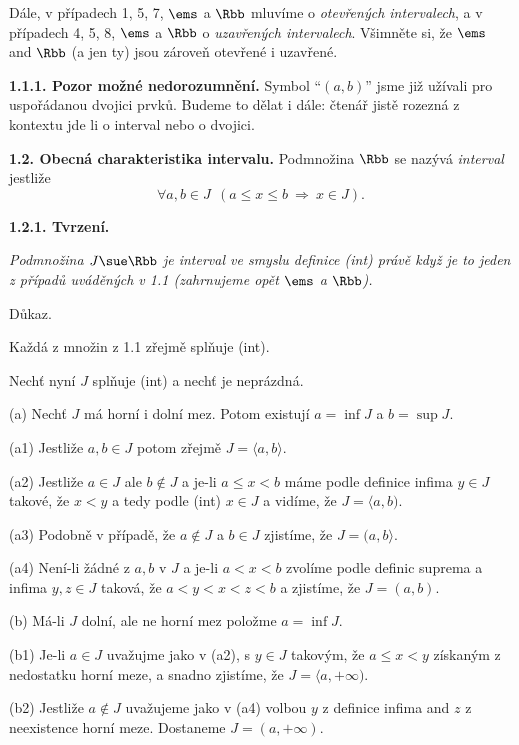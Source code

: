 \documentclass[12pt]{article}
\begin{document}
{Dále, v případech 1, 5, 7, $\ems$ a $\Rbb$ mluvíme o  {\em otevřených intervalech}, a
 v případech 4, 5, 8, $\ems$ a $\Rbb$ o {\em uzavřených intervalech}. Všimněte si, že $\ems$ and
 $\Rbb$ (a jen ty) jsou zároveň otevřené i uzavřené.
 
 \medskip
 
 {\bf 1.1.1. Pozor možn\'e nedorozumnění.} Symbol ``$(a,b)$'' jsme již užívali pro uspořádanou dvojici prvků. Budeme to dělat i dále: čtenář jistě rozezná z kontextu jde li o interval nebo o dvojici.
 
 \bigskip
 
 {\bf 1.2. Obecná charakteristika intervalu.} Podmnožina $\Rbb$ se nazývá 
{\em interval} jestliže
 \begin{equation}
 \forall a,b\in J\ \ (a\leq x\leq b\ \Rightarrow\ x\in J). \tag{int}
 \end{equation}
 
 \medskip
 
 {\bf 1.2.1. Tvrzení.} {\em Podmnožina $J\sue\Rbb$ je interval ve smyslu definice {\em (int)} právě když je to  jeden z případů uváděných v 1.1 (zahrnujeme opět $\ems$ a $\Rbb$).
 
 Důkaz.} Každá z množin z 1.1 zřejmě splňuje (int).
 
 Nechť nyní $J$ splňuje (int) a nechť je neprázdná. 
 
 \smallskip
 
 (a) Nechť  $J$ má horní i dolní mez. Potom existují $a=\inf J$ a
 $b=\sup J$. 
 
 (a1) Jestliže $a,b\in J$ potom zřejmě $J=\langle a,b\rangle$.
 
 (a2) Jestliže $a\in J$ ale $b\notin J$ a je-li $a\leq x< b$ máme podle definice infima $y\in J$ takové, že $x< y$ a tedy podle (int) $x\in J$ a vidíme, že $J= \langle a,b)$.
 
 (a3) Podobně v případě, že $a\notin J$ a $b\in J$ zjistíme, že $J=(a,b\rangle$.
 
 (a4) Není-li žádné z $a,b$ v $J$ a je-li $a<x<b$ zvolíme podle definic suprema a infima $y,z\in J$ taková, že $a<y<x<z<b$ a zjistíme, že  $J=(a,b)$.
 
 \smallskip
 
 (b) Má-li $J$ dolní, ale ne horní mez položme $a=\inf J$.
 
 (b1) Je-li $a\in J$ uvažujme jako v (a2), s $y\in J$ takovým, že $a\leq x<y$ získaným 
z nedostatku horní meze, a snadno zjistíme, že $J=\langle a,+\infty)$.
 
 (b2) Jestliže $a\notin J$ uvažujeme jako v (a4) volbou $y$ z definice  infima and $z$ z neexistence horní meze. Dostaneme $J=(a,+\infty)$.
 
}
\end{document}
